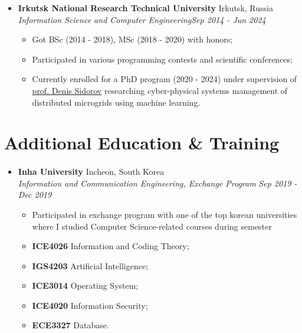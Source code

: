 \documentclass[10pt]{article}
\begin{document}
\begin{itemize}[noitemsep,topsep=0pt]
    \item \normalsize{\textbf{Irkutsk National Research Technical University}} \normalsize{\hfill Irkutsk, Russia 
    \\    \textit{ Information Science and Computer Engineering}\hfill \textit{Sep 2014 - Jun 2024}}
            \begin{itemize}[topsep=5pt] \normalsize

                \item {Got BSc (2014 - 2018), MSc (2018 - 2020) with honors;}
                \item {Participated in various programming contests and scientific conferences;}
                    \item {Currently enrolled for a PhD program (2020 - 2024) under supervision of \href{http://www.mathnet.ru/eng/person17845}{prof. Denis Sidorov} researching cyber-physical systems management of distributed microgrids using machine learning.}
            \end{itemize}
        \end{itemize}


\section{Additional Education \& Training}
\paragraph{}

\begin{itemize}[noitemsep,topsep=0pt]
    \item \normalsize{\textbf{Inha University}} \normalsize{\hfill Incheon, South Korea 
    \\    \textit{ Information and Communication Engineering, Exchange Program }\hfill \textit{Sep 2019 - Dec 2019}}
            \begin{itemize}[itemsep=1pt,topsep=5pt] \normalsize
                \item{Participated in exchange program with one of the top korean universities where I studied Computer Science-related courses during semester}
                \item{\textbf{ICE4026} Information and Coding Theory;}
                \item{\textbf{IGS4203} Artificial Intelligence;}
                \item{\textbf{ICE3014} Operating System;}
                \item{\textbf{ICE4020} Information Security;}
                \item{\textbf{ECE3327} Database.}
                    
            \end{itemize}
        \end{itemize}
\end{document}
